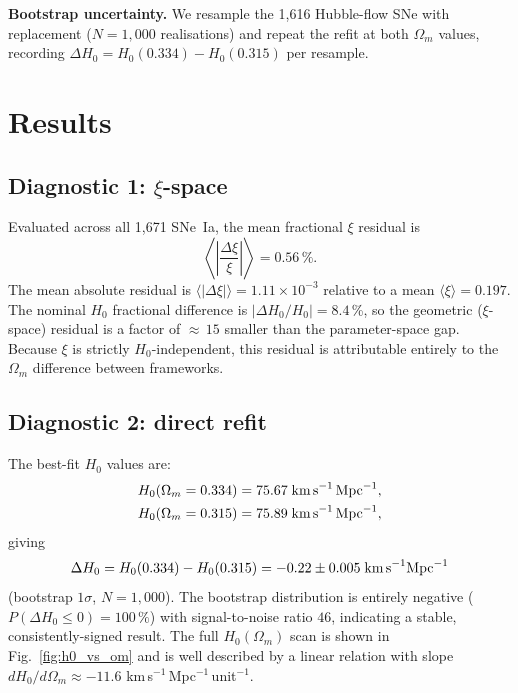 \documentclass[usenatbib]{mnras}
\begin{document}
\textbf{Bootstrap uncertainty.}
We resample the 1{,}616 Hubble-flow SNe with replacement ($N=1{,}000$
realisations) and repeat the refit at both $\Omega_m$ values, recording
$\Delta H_0 = H_0(0.334) - H_0(0.315)$ per resample.

\section{Results}
\label{sec:results}

\subsection{Diagnostic 1: $\xi$-space}
\label{sec:results_xi}

Evaluated across all 1{,}671 SNe~Ia, the mean fractional $\xi$ residual is
\begin{equation}
  \left\langle\left|\frac{\Delta\xi}{\xi}\right|\right\rangle
  = 0.56\,\%.
\end{equation}
The mean absolute residual is $\langle|\Delta\xi|\rangle = 1.11 \times 10^{-3}$
relative to a mean $\langle\xi\rangle = 0.197$.
The nominal $H_0$ fractional difference is $|{\Delta H_0}/{H_0}| = 8.4$\,\%,
so the geometric ($\xi$-space) residual is a factor of
${\approx}\,15$ smaller than the parameter-space gap.
Because $\xi$ is strictly $H_0$-independent, this residual is
attributable entirely to the $\Omega_m$ difference between frameworks.

\subsection{Diagnostic 2: direct refit}
\label{sec:results_refit}

The best-fit $H_0$ values are:
\begin{align}
  H_0(\Omega_m = 0.334) &= 75.67 \;\text{km\,s}^{-1}\text{\,Mpc}^{-1}, \\
  H_0(\Omega_m = 0.315) &= 75.89 \;\text{km\,s}^{-1}\text{\,Mpc}^{-1},
\end{align}
giving
\begin{equation}
  \Delta H_0 = H_0(0.334) - H_0(0.315) = -0.22 \pm 0.005
  \;\text{km\,s}^{-1}\text{Mpc}^{-1}
\end{equation}
(bootstrap $1\sigma$, $N=1{,}000$).
The bootstrap distribution is entirely negative ($P(\Delta H_0 \leq 0) = 100\,\%$)
with signal-to-noise ratio $46$, indicating a stable, consistently-signed result.
The full $H_0(\Omega_m)$ scan is shown in Fig.~\ref{fig:h0_vs_om}
and is well described by a linear relation with slope
$dH_0/d\Omega_m \approx -11.6$ km\,s$^{-1}$\,Mpc$^{-1}$\,unit$^{-1}$.
\end{document}
